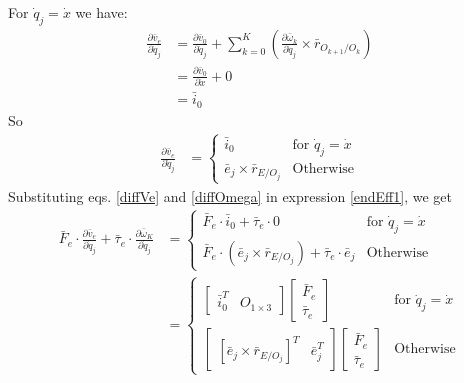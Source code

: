 \documentclass[a4paper,10pt]{article}
\begin{document}
For $\dot{q}_j = \dot{x}$ we have:
\begin{align}
 \frac{\partial \bar{v}_e}{\partial \dot{q}_j} &= \frac{\partial \bar{v}_0}{\partial \dot{q}_j} + \sum\limits_{k=0}^K \left( \frac{\partial \bar\omega_k}{\partial \dot{q}_j} \times \bar{r}_{O_{k+1}/O_k} \right) \nonumber \\
 &=  \frac{\partial \bar{v}_0}{\partial \dot{x}} + 0 \nonumber \\
 &=  \bar{i}_0 \nonumber 
\end{align}
So
\begin{align}
 \frac{\partial \bar{v}_e}{\partial \dot{q}_j} &= \begin{cases}
                                                   \bar{i}_0 & \mbox{for } \dot{q}_j = \dot{x} \\
                                                   \bar{e}_j \times \bar{r}_{E/O_j} & \mbox{Otherwise} 
                                                  \end{cases} \label{diffVe}
\end{align}
Substituting eqs. \ref{diffVe} and \ref{diffOmega} in expression \ref{endEff1}, we get
\begin{align}
 \bar{F}_{e} \cdot \frac{\partial \bar{v}_e}{\partial \dot{q}_j} + \bar\tau_{e} \cdot \frac{\partial \bar\omega_K}{\partial \dot{q}_j} 
 &= \begin{cases}
      \bar{F}_{e} \cdot \bar{i}_0 + \bar\tau_{e} \cdot 0 & \mbox{for } \dot{q}_j = \dot{x} \\
      \bar{F}_{e} \cdot \left(\bar{e}_j \times \bar{r}_{E/O_j}\right) + \bar\tau_{e} \cdot \bar{e}_j & \mbox{Otherwise}
    \end{cases} \nonumber \\     
 &= \begin{cases}
     \left[\begin{matrix} \bar{i}_0^T & O_{1\times3} \end{matrix} \right]\left[\begin{matrix} \bar{F}_e \\ \bar{\tau}_e \end{matrix} \right] & \mbox{for } \dot{q}_j = \dot{x} \\
     \left[\begin{matrix} \left[\bar{e}_j \times \bar{r}_{E/O_j}\right]^T & \bar{e}_j^T \end{matrix} \right]\left[\begin{matrix} \bar{F}_e \\ \bar{\tau}_e \end{matrix} \right] & \mbox{Otherwise}
    \end{cases} \nonumber 
\end{align}
\end{document}
